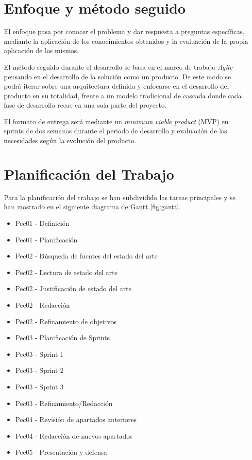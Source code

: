 \section{Enfoque y método seguido}
El enfoque pasa por conocer el problema y dar respuesta a preguntas específicas, mediante la aplicación de los conocimientos obtenidos y la evaluación de la propia aplicación de los mismos.  \par

\vspace{0.5cm}

El método seguido durante el desarrollo se basa en el marco de trabajo \textit{Agile} pensando en el desarrollo de la solución como un producto. De este modo se podrá iterar sobre una arquitectura definida y enfocarse en el desarrollo del producto en su totalidad, frente a un modelo tradicional de cascada donde cada fase de desarrollo recae en una sola parte del proyecto.

\vspace{0.5cm}

El formato de entrega será mediante un \textit{minimum viable product} (MVP) en sprints de dos semanas durante el periodo de desarrollo y evaluación de las necesidades según la evolución del producto.

\section{Planificación del Trabajo}

Para la planificación del trabajo se han subdividido las tareas principales y se han mostrado en el siguiente diagrama de Gantt \ref{fig:gantt}.

\begin{itemize}
    \item Pec01 - Definición
    \item Pec01 - Planificación
    \item Pec02 - Búsqueda de fuentes del estado del arte
    \item Pec02 - Lectura de estado del arte
    \item Pec02 - Justificación de estado del arte
    \item Pec02 - Redacción
    \item Pec02 - Refinamiento de objetivos
    \item Pec03 - Planificación de Sprints
    \item Pec03 - Sprint 1
    \item Pec03 - Sprint 2
    \item Pec03 - Sprint 3
    \item Pec03 - Refinamiento/Redacción
    \item Pec04 - Revisión de apartados anteriores
    \item Pec04 - Redacción de nuevos apartados
    \item Pec05 - Presentación y defensa
\end{itemize}



